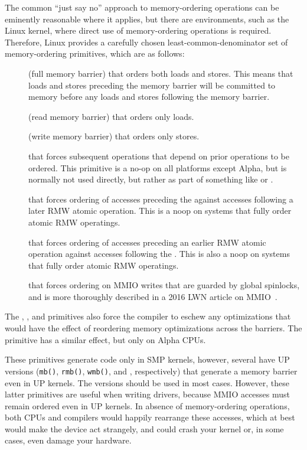 The common ``just say no'' approach to memory-ordering operations
can be eminently reasonable where it applies,
but there are environments, such as the Linux kernel, where direct
use of memory-ordering operations is required.
Therefore,
Linux provides a carefully chosen least-common-denominator
set of memory-ordering primitives, which are as follows:
\begin{description}
\item	[] (full memory barrier) that orders both loads and
	stores.
	This means that loads and stores preceding the memory barrier
	will be committed to memory before any loads and stores
	following the memory barrier.
\item	[] (read memory barrier) that orders only loads.
\item	[] (write memory barrier) that orders only stores.
\item	[] that forces subsequent operations
	that depend on prior operations to be ordered.
	This primitive is a no-op on all platforms except Alpha, but
	is normally not used directly, but rather as part of
	something like  or .
\item	[] that forces ordering of accesses
	preceding the  against accesses following
	a later RMW atomic operation.
	This is a noop on systems that fully order atomic RMW operatings.
\item	[] that forces ordering of accesses
	preceding an earlier RMW atomic operation against accesses
	following the .
	This is also a noop on systems that fully order atomic RMW operatings.
\item	[] that forces ordering on MMIO writes that are guarded
	by global spinlocks, and is more thoroughly described
	in a 2016 LWN article on MMIO~\cite{PaulEMcKenney2016LinuxKernelMMIO}.
\end{description}
The , , and 
primitives also force
the compiler to eschew any optimizations that would have the effect
of reordering memory optimizations across the barriers.
The  primitive has a similar effect, but
only on Alpha CPUs.

These primitives generate code only in SMP kernels, however, several
have UP versions ({\tt mb()}, {\tt rmb()}, {\tt wmb()},
and ,
respectively) that generate a memory barrier even in UP kernels. The 
versions should be used in most cases. However, these latter primitives
are useful when writing drivers, because MMIO accesses must remain
ordered even in UP kernels. In absence of memory-ordering operations,
both CPUs and compilers would happily rearrange these accesses, which at
best would make the device act strangely, and could crash your kernel or,
in some cases, even damage your hardware.

